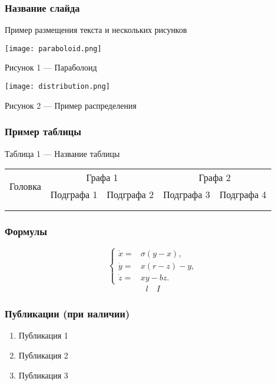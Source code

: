 \begin{frame}
\frametitle{Название слайда}
Пример размещения текста и нескольких рисунков
	\begin{center}
	\begin{minipage}[h]{0.39\linewidth}
		\begin{center}
			\texttt{[image: paraboloid.png]}
			
			\small Рисунок 1 --- Параболоид	
		\end{center}
	\end{minipage}
	\hfill 
	\begin{minipage}[h]{0.59\linewidth}
		\begin{center}
			\texttt{[image: distribution.png]}
			
			\small Рисунок 2 --- Пример распределения
		\end{center}
	\end{minipage}
	\end{center}

\end{frame}


\begin{frame}
\frametitle{Пример таблицы}
	\begin{center}
		\begin{center}
		Таблица 1 --- Название таблицы
		\end{center}
		\small
		\begin{tabularx}{\textwidth}{|X|X|X|X|X|}
			\hline 
			\multirow{2}{*}{Головка} 
			& \multicolumn{2}{c|}{Графа 1} & \multicolumn{2}{c|}{Графа 2} \\
			\cline{2-5}
  			& Подграфа 1 & Подграфа 2 & Подграфа 3 & Подграфа 4 \\ 
			\hline
  			&   &   &   &  \\ 
			\hline
  			&   &   &   &  \\ 
			\hline 
		\end{tabularx}
	\end{center}
\end{frame}


\begin{frame}
\frametitle{Формулы}
	\label{r1}
	\begin{equation}
	\left\{
  		\begin{array}{rl}
    	\dot x = & \sigma (y-x), \\
    	\dot y = & x (r - z) - y, \\
    	\dot z = & xy - bz.
  	\end{array} \right.
	\end{equation}
	\begin{eqnarray}
	l \quad I
	\end{eqnarray}
\end{frame}



\begin{frame}
\frametitle{Публикации (при наличии)}
	\vspace{0.5cm}
	\begin{enumerate}
		\item Публикация 1
		\item Публикация 2
		\item Публикация 3
	\end{enumerate}
	\vspace*{10cm}
\end{frame}
